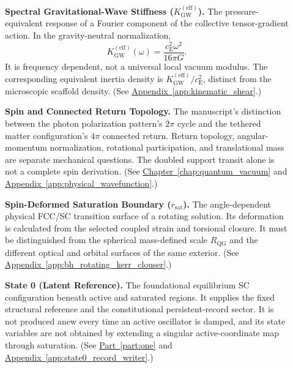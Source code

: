 \begin{description}
\item[] \begin{minipage}[t]{\linewidth}
\textbf{Spectral Gravitational-Wave Stiffness ($K_{\mathrm{GW}}^{(\mathrm{eff})}$).} The pressure-equivalent response of a Fourier component of the collective tensor-gradient action. In the gravity-neutral normalization,
\[
 K_{\mathrm{GW}}^{(\mathrm{eff})}(\omega)
 =\frac{c_{\mathrm E}^2\omega^2}{16\pi G}.
\]
It is frequency dependent, not a universal local vacuum modulus. The corresponding equivalent inertia density is $K_{\mathrm{GW}}^{(\mathrm{eff})}/c_{\mathrm E}^2$, distinct from the microscopic scaffold density.
(See \hyperref[app:kinematic_shear]{Appendix~\ref*{app:kinematic_shear}}.)
\end{minipage}

\item[] \begin{minipage}[t]{\linewidth}
\textbf{Spin and Connected Return Topology.} The manuscript's distinction between the photon polarization pattern's $2\pi$ cycle and the tethered matter configuration's $4\pi$ connected return. Return topology, angular-momentum normalization, rotational participation, and translational mass are separate mechanical questions. The doubled support transit alone is not a complete spin derivation.
(See \hyperref[chap:quantum_vacuum]{Chapter~\ref*{chap:quantum_vacuum}} and \hyperref[app:physical_wavefunction]{Appendix~\ref*{app:physical_wavefunction}}.)
\end{minipage}

\item[] \begin{minipage}[t]{\linewidth}
\textbf{Spin-Deformed Saturation Boundary ($r_{\mathrm{sat}}$).} The angle-dependent physical FCC/SC transition surface of a rotating solution. Its deformation is calculated from the selected coupled strain and torsional closure. It must be distinguished from the spherical mass-defined scale $R_{\mathrm{QG}}$ and the different optical and orbital surfaces of the same exterior.
(See \hyperref[app:bh_rotating_kerr_clouser]{Appendix~\ref*{app:bh_rotating_kerr_clouser}}.)
\end{minipage}

\item[] \begin{minipage}[t]{\linewidth}
\textbf{State 0 (Latent Reference).} The foundational equilibrium SC configuration beneath active and saturated regions. It supplies the fixed structural reference and the constitutional persistent-record sector. It is not produced anew every time an active oscillator is damped, and its state variables are not obtained by extending a singular active-coordinate map through saturation.
(See \hyperref[part:one]{Part~\ref*{part:one}} and \hyperref[app:state0_record_writer]{Appendix~\ref*{app:state0_record_writer}}.)
\end{minipage}


\end{description}
